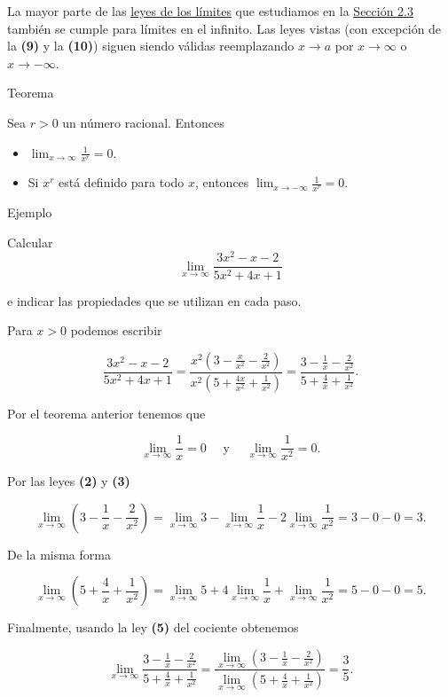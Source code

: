 \documentclass[
  letterpaper,
]{book}
\theoremstyle{plain}
\theoremstyle{remark}
\begin{document}
La mayor parte de las \hyperref[thm-leyes-limites]{leyes de los límites}
que estudiamos en la \hyperref[seccion_2.3]{Sección 2.3} también se
cumple para límites en el infinito. Las leyes vistas (con excepción de
la \textbf{(9)} y la \textbf{(10)}) siguen siendo válidas reemplazando
\(x\to a\) por \(x \to \infty\) o \(x\to -\infty\).

Teorema

Sea \(r>0\) un número racional. Entonces

\begin{itemize}
\item
  \(\displaystyle\lim_{x\to \infty} \frac{1}{x^r}=0\).
\item
  Si \(x^r\) está definido para todo \(x\), entonces
  \(\displaystyle\lim_{x\to -\infty} \frac{1}{x^r}=0\).
\end{itemize}

Ejemplo

Calcular \[
\lim_{x\to \infty}\frac{3x^2-x-2}{5x^2+4x+1}
\]

e indicar las propiedades que se utilizan en cada paso.

\begin{tcolorbox}[enhanced jigsaw, opacityback=0, left=2mm, opacitybacktitle=0.6, toprule=.15mm, bottomrule=.15mm, colbacktitle=quarto-callout-tip-color!10!white, titlerule=0mm, bottomtitle=1mm, title=\textcolor{quarto-callout-tip-color}{\faLightbulb}\hspace{0.5em}{Solución}, toptitle=1mm, colframe=quarto-callout-tip-color-frame, colback=white, breakable, rightrule=.15mm, arc=.35mm, leftrule=.75mm, coltitle=black]

Para \(x>0\) podemos escribir

\[
\frac{3x^2-x-2}{5x^2+4x+1}=\frac{x^2\left(3-\frac{x}{x^2}-\frac{2}{x^2}\right)}{x^2\left(5+\frac{4x}{x^2}+\frac{1}{x^2}\right)}=\frac{3-\frac{1}{x}-\frac{2}{x^2}}{5+\frac{4}{x}+\frac{1}{x^2}}.
\]

Por el teorema anterior tenemos que

\[
\lim_{x\to \infty} \frac{1}{x}=0 \quad \text{ y }\quad \lim_{x\to \infty} \frac{1}{x^2}=0.
\]

Por las leyes \textbf{(2)} y \textbf{(3)}

\[
\lim_{x\to \infty} \left(3-\frac{1}{x}-\frac{2}{x^2}\right)=\lim_{x\to \infty} 3-\lim_{x\to \infty} \frac{1}{x}-2\lim_{x\to \infty} \frac{1}{x^2}=3-0-0=3.
\]

De la misma forma

\[
\lim_{x\to \infty} \left(5+\frac{4}{x}+\frac{1}{x^2}\right)=\lim_{x\to \infty} 5+4\lim_{x\to \infty} \frac{1}{x}+\lim_{x\to \infty} \frac{1}{x^2}=5-0-0=5.
\]

Finalmente, usando la ley \textbf{(5)} del cociente obtenemos

\[
\lim_{x\to \infty} \frac{3-\frac{1}{x}-\frac{2}{x^2}}{5+\frac{4}{x}+\frac{1}{x^2}}=\frac{\lim_{x\to\infty}\left(3-\frac{1}{x}-\frac{2}{x^2}\right)}{\lim_{x\to\infty} \left(5+\frac{4}{x}+\frac{1}{x^2}\right)}=\frac{3}{5}.
\]

\end{tcolorbox}
\end{document}

